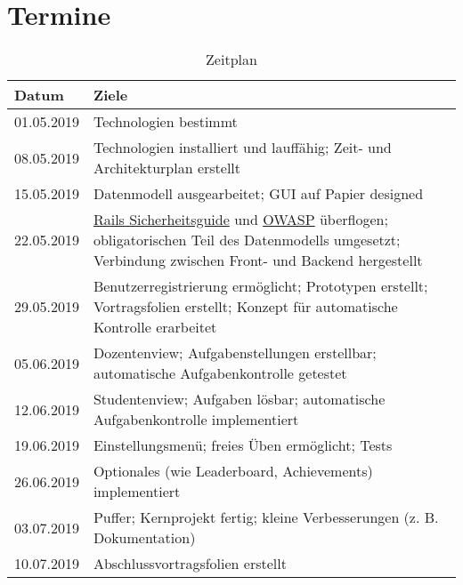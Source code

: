 \section{Termine}\label{sec:schedule}

\begin{table}

\caption{Zeitplan}\label{tab:schedule}

\begin{tabularx}{\textwidth}{lX}
Datum & Ziele \\
\hline
01.05.2019 & Technologien bestimmt\\
08.05.2019 & Technologien installiert und lauffähig; Zeit- und Architekturplan erstellt\\
15.05.2019 & Datenmodell ausgearbeitet; GUI auf Papier designed\\
22.05.2019 & \href{https://guides.rubyonrails.org/security.html}{Rails Sicherheitsguide} und \href{https://github.com/OWASP/CheatSheetSeries}{OWASP} überflogen; obligatorischen Teil des Datenmodells umgesetzt; Verbindung zwischen Front- und Backend hergestellt \\
29.05.2019 & Benutzerregistrierung ermöglicht; Prototypen erstellt; Vortragsfolien erstellt; Konzept für automatische Kontrolle erarbeitet\\
\hline
05.06.2019 & Dozentenview; Aufgabenstellungen erstellbar; automatische Aufgabenkontrolle getestet\\
12.06.2019 & Studentenview; Aufgaben lösbar; automatische Aufgabenkontrolle implementiert\\
19.06.2019 & Einstellungsmenü; freies Üben ermöglicht; Tests \\
26.06.2019 & Optionales (wie Leaderboard, Achievements) implementiert \\
\hline
03.07.2019 & Puffer; Kernprojekt fertig; kleine Verbesserungen (z. B. Dokumentation)\\
10.07.2019 & Abschlussvortragsfolien erstellt\\
\end{tabularx}

\end{table}
